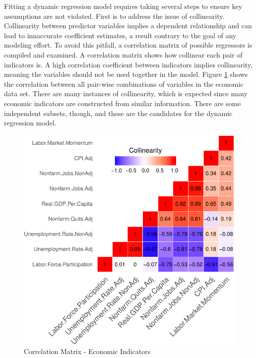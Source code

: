 \documentclass[12pt,letterpaper,toc=flat,oneside]{report}
\theoremstyle{definition}
\theoremstyle{definition}
\theoremstyle{definition}
\theoremstyle{remark}
\begin{document}
Fitting a dynamic regression model requires taking several steps to
ensure key assumptions are not violated. First is to address the issue
of collinearity. Collinearity between predictor variables implies a
dependent relationship and can lead to innaccurate coefficient
estimates, a result contrary to the goal of any modeling effort. To
avoid this pitfall, a correlation matrix of possible regressors is
compiled and examined. A correlation matrix shows how collinear each
pair of indicators is. A high correlation coefficient between indicators
implies collinearity, meaning the variables should not be used together
in the model. Figure \ref{fig:heat-map-1} shows the correlation between
all pair-wise combinations of variables in the economic data set. There
are many instances of collinearity, which is expected since many
economic indicators are constructed from similar information. There are
some independent subsets, though, and these are the candidates for the
dynamic regression model.

\begin{figure}[H]

{\centering \includegraphics{elliott-econometric-personnel-retention-18_files/figure-latex/heat-map-1-1} 

}

\caption{Correlation Matrix - Economic Indicators}\label{fig:heat-map-1}
\end{figure}
\end{document}
